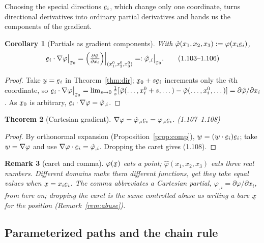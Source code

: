 \documentclass[17pt,a4paper]{extreport}
\DeclareRobustCommand{\vek}[1]{\underaccent{\tilde}{#1}}
\newcommand{\grad}{\nabla}
\newcommand{\bu}{\vek{u}}
\newcommand{\bw}{\vek{w}}
\newcommand{\bx}{\vek{x}}
\newcommand{\be}{\vek{e}}
\newcommand{\ip}[2]{#1\cdot#2}
\newcommand{\rest}[1]{\big|_{#1}}
\theoremstyle{scplain}
\newtheorem{theorem}{Theorem}[chapter]
\newtheorem{corollary}[theorem]{Corollary}
\theoremstyle{scdefn}
\newtheorem{remark}[theorem]{Remark}
\theoremstyle{scplain}
\begin{document}
Choosing the special directions $\be_i$, which change only one coordinate,
turns directional derivatives into ordinary partial derivatives and hands
us the components of the gradient.

\begin{corollary}[Partials as gradient components]\label{cor:partial}
With $\hat\varphi(x_1,x_2,x_3):=\varphi(x_i\be_i)$,
\begin{equation}
\be_i\cdot\grad\varphi\rest{\bx_0}
=\Big(\tfrac{\partial\hat\varphi}{\partial x_i}\Big)
\Big|_{(x_1^0,x_2^0,x_3^0)}=:\hat\varphi_{,i}\rest{\bx_0}. \tag{1.103--1.106}\label{eq:1.103}
\end{equation}
\end{corollary}

\begin{proof}
Take $\bu=\be_i$ in Theorem~\ref{thm:dir}; $\bx_0+s\be_i$ increments only
the $i$th coordinate, so
$\be_i\cdot\grad\varphi\rest{\bx_0}=\lim_{s\to0}\tfrac1s[
\hat\varphi(\dots,x_i^0+s,\dots)-\hat\varphi(\dots,x_i^0,\dots)]
=\partial\hat\varphi/\partial x_i$. As $\bx_0$ is arbitrary,
$\be_i\cdot\grad\varphi=\hat\varphi_{,i}$.
\end{proof}

\begin{theorem}[Cartesian gradient]\label{thm:cart}
$\grad\varphi=\hat\varphi_{,i}\be_i=\varphi_{,i}\be_i$.
\hfill\textup{(1.107--1.108)}
\end{theorem}

\begin{proof}
By orthonormal expansion (Proposition~\ref{prop:comp}),
$\bw=(\ip\bw{\be_i})\be_i$; take $\bw=\grad\varphi$ and use
$\ip{\grad\varphi}{\be_i}=\hat\varphi_{,i}$. Dropping the caret gives
(1.108).
\end{proof}

\begin{remark}[caret and comma]\label{rem:caret}
$\varphi(\bx)$ eats a point; $\hat\varphi(x_1,x_2,x_3)$ eats three real
numbers. Different domains make them different functions, yet they take
equal values when $\bx=x_i\be_i$. The comma abbreviates a Cartesian
partial, $\varphi_{,i}=\partial\varphi/\partial x_i$, from here on;
dropping the caret is the same controlled abuse as writing a bare $\bx$ for
the position (Remark~\ref{rem:abuse}).
\end{remark}

\subsection{Parameterized paths and the chain rule}\label{ss:chain}
\end{document}
